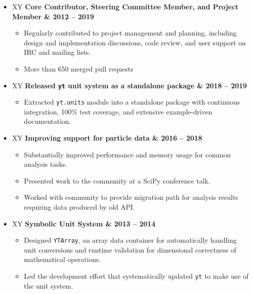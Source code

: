 \documentclass[10pt,letterpaper]{article}
\newcommand{\textline}[2]{
  \begin{tabularx}{\textwidth}{XY}
  #1 & #2
  \end{tabularx}
}
\begin{document}
\begin{itemize}

\item[] \textline{\bf Core Contributor, Steering Committee Member, and Project Member}{2012 -- 2019}  %
  \begin{itemize}
    \item Regularly contributed to project management and planning, including
      design and implementation discussions, code review, and user support on
      IRC and mailing lists.
    \item More than 650 merged pull requests
  \end{itemize}

\item[] \textline{\bf Released \texttt{yt} unit system as a standalone package}{2018 -- 2019}  %
  \begin{itemize}
    \item Extracted \texttt{yt.units} module into a standalone package with
      continuous integration, 100\% test coverage, and extensive example-driven
      documentation.
  \end{itemize}

\item[] \textline{\bf Improving support for particle data}{2016 -- 2018}  %
  \begin{itemize}
  \item Substantially improved performance and memory usage for common analysis
    tasks.
  \item Presented work to the community at a SciPy conference talk.
  \item Worked with community to provide migration path for analysis results
    requiring data produced by old API.\@
  \end{itemize}

\item[] \textline{\bf Symbolic Unit System}{2013 -- 2014}  %
  \begin{itemize}
    \item Designed \texttt{YTArray}, an array data container for automatically
      handling unit conversions and runtime validation for dimensional correctness
      of mathematical operations.
    \item Led the development effort that systematically updated \texttt{yt} to
      make use of the unit system.
  \end{itemize}


\end{itemize}
\end{document}
